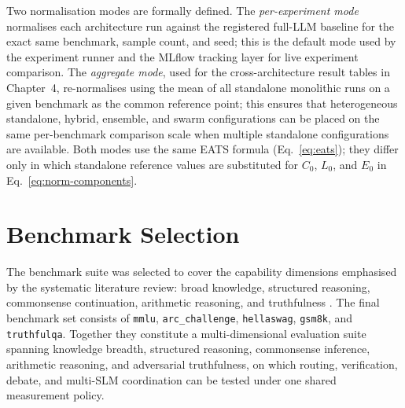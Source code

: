 Two normalisation modes are formally defined. The \emph{per-experiment mode} normalises each architecture run against the registered full-LLM baseline for the exact same benchmark, sample count, and seed; this is the default mode used by the experiment runner and the MLflow tracking layer for live experiment comparison. The \emph{aggregate mode}, used for the cross-architecture result tables in Chapter~4, re-normalises using the mean of all standalone monolithic runs on a given benchmark as the common reference point; this ensures that heterogeneous standalone, hybrid, ensemble, and swarm configurations can be placed on the same per-benchmark comparison scale when multiple standalone configurations are available. Both modes use the same EATS formula (Eq.~\eqref{eq:eats}); they differ only in which standalone reference values are substituted for $C_0$, $L_0$, and $E_0$ in Eq.~\eqref{eq:norm-components}.

\section{Benchmark Selection}
\label{sec:benchmarks}

The benchmark suite was selected to cover the capability dimensions emphasised by the systematic literature review: broad knowledge, structured reasoning, commonsense continuation, arithmetic reasoning, and truthfulness \cite{slrmanuscript2026}. The final benchmark set consists of \texttt{mmlu}, \texttt{arc\_challenge}, \texttt{hellaswag}, \texttt{gsm8k}, and \texttt{truthfulqa}. Together they constitute a multi-dimensional evaluation suite spanning knowledge breadth, structured reasoning, commonsense inference, arithmetic reasoning, and adversarial truthfulness, on which routing, verification, debate, and multi-SLM coordination can be tested under one shared measurement policy.

